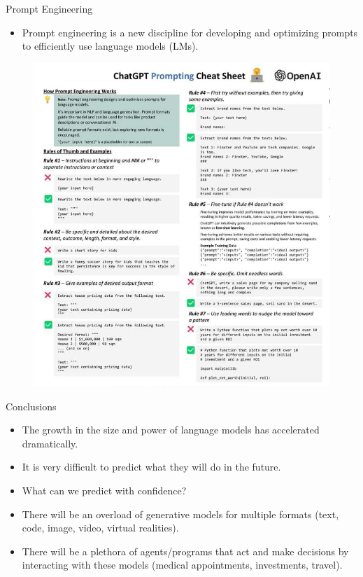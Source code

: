 \documentclass[handout]{beamer}
\begin{document}
\begin{frame}{Prompt Engineering}
\begin{scriptsize}
\begin{itemize}
\item Prompt engineering is a new discipline for developing and optimizing prompts to efficiently use language models (LMs).
\end{itemize}
\end{scriptsize}
 \begin{figure}[h]
        	\includegraphics[scale = 0.33]{pics/prompting.png}
        \end{figure}




\end{frame}


\begin{frame}{Conclusions}

\begin{scriptsize}
\begin{itemize}
\item The growth in the size and power of language models has accelerated dramatically.
\item It is very difficult to predict what they will do in the future.
\item What can we predict with confidence?
\item There will be an overload of generative models for multiple formats (text, code, image, video, virtual realities).
\item There will be a plethora of agents/programs that act and make decisions by interacting with these models (medical appointments, investments, travel).
\end{itemize}
\end{scriptsize}



\end{frame}
\end{document}
